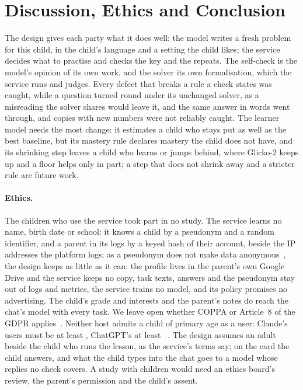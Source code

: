 \section{Discussion, Ethics and Conclusion}
\label{sec:discussion}

The design gives each party what it does well: the model writes a fresh problem for this child, in the child's language and a setting the child likes; the service decides what to practise and checks the key and the repeats. The self-check is the model's opinion of its own work, and the solver its own formalisation, which the service runs and judges. Every defect that breaks a rule a check states was caught, while a question turned round under its unchanged solver, as a misreading the solver shares would leave it, and the same answer in words went through, and copies with new numbers were not reliably caught. The learner model needs the most change: it estimates a child who stays put as well as the best baseline, but its mastery rule declares mastery the child does not have, and its shrinking step leaves a child who learns or jumps behind, where Glicko-2 keeps up and a floor helps only in part; a step that does not shrink away and a stricter rule are future work.

\paragraph{Ethics.} The children who use the service took part in no study. The service learns no name, birth date or school: it knows a child by a pseudonym and a random identifier, and a parent in its logs by a keyed hash of their account, beside the IP addresses the platform logs; as a pseudonym does not make data anonymous~\cite{gdpr2016regulation}, the design keeps as little as it can: the profile lives in the parent's own Google Drive and the service keeps no copy, task texts, answers and the pseudonym stay out of logs and metrics, the service trains no model, and its policy promises no advertising. The child's grade and interests and the parent's notes do reach the chat's model with every task. We leave open whether COPPA or Article~8 of the GDPR applies~\cite{coppa2025rule,gdpr2016regulation}. Neither host admits a child of primary age as a user: Claude's users must be at least , ChatGPT's at least ~\cite{anthropic2025consumerterms,openai2026terms}. The design assumes an adult beside the child who runs the lesson, as the service's terms say; on the card the child answers, and what the child types into the chat goes to a model whose replies no check covers. A study with children would need an ethics board's review, the parent's permission and the child's assent.

